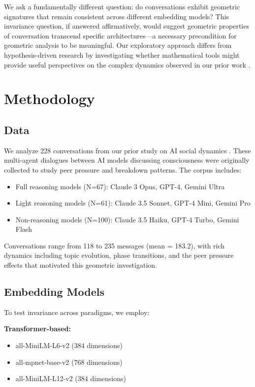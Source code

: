 \documentclass[11pt,letterpaper]{article}
\newcommand{\totalConversations}{228}
\newcommand{\minConvLength}{118}
\newcommand{\maxConvLength}{235}
\newcommand{\meanConvLength}{183.2}
\begin{document}
We ask a fundamentally different question: do conversations exhibit geometric signatures that remain consistent across different embedding models? This invariance question, if answered affirmatively, would suggest geometric properties of conversation transcend specific architectures—a necessary precondition for geometric analysis to be meaningful. Our exploratory approach differs from hypothesis-driven research by investigating whether mathematical tools might provide useful perspectives on the complex dynamics observed in our prior work \citep{garcia2025peer}.

\section{Methodology}

\subsection{Data}

We analyze \totalConversations{} conversations from our prior study on AI social dynamics \citep{garcia2025peer}. These multi-agent dialogues between AI models discussing consciousness were originally collected to study peer pressure and breakdown patterns. The corpus includes:

\begin{itemize}
\item Full reasoning models (N=67): Claude 3 Opus, GPT-4, Gemini Ultra
\item Light reasoning models (N=61): Claude 3.5 Sonnet, GPT-4 Mini, Gemini Pro
\item Non-reasoning models (N=100): Claude 3.5 Haiku, GPT-4 Turbo, Gemini Flash
\end{itemize}

Conversations range from \minConvLength{} to \maxConvLength{} messages (mean = \meanConvLength{}), with rich dynamics including topic evolution, phase transitions, and the peer pressure effects that motivated this geometric investigation.

\subsection{Embedding Models}

To test invariance across paradigms, we employ:

\textbf{Transformer-based:}
\begin{itemize}
\item all-MiniLM-L6-v2 (384 dimensions)
\item all-mpnet-base-v2 (768 dimensions)  
\item all-MiniLM-L12-v2 (384 dimensions)
\end{itemize}
\end{document}
